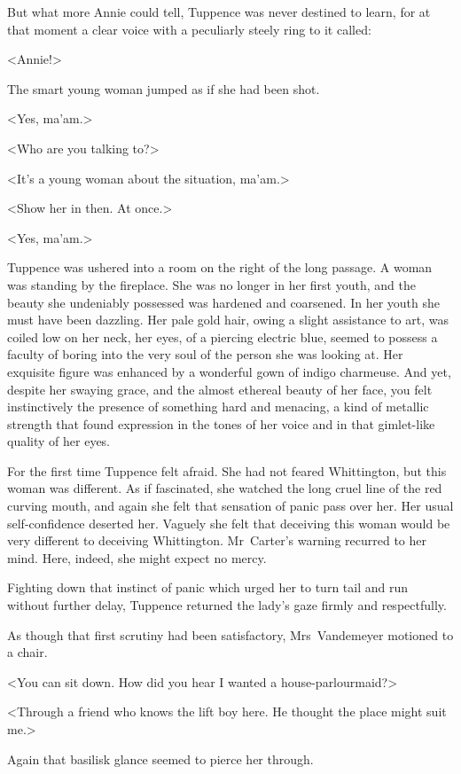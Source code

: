 But what more Annie could tell, Tuppence was never destined to learn, for at that moment a clear voice with a peculiarly steely ring to it called:

<Annie!>

The smart young woman jumped as if she had been shot.

<Yes, ma'am.>

<Who are you talking to?>

<It's a young woman about the situation, ma'am.>

<Show her in then. At once.>

<Yes, ma'am.>

Tuppence was ushered into a room on the right of the long passage. A woman was standing by the fireplace. She was no longer in her first youth, and the beauty she undeniably possessed was hardened and coarsened. In her youth she must have been dazzling. Her pale gold hair, owing a slight assistance to art, was coiled low on her neck, her eyes, of a piercing electric blue, seemed to possess a faculty of boring into the very soul of the person she was looking at. Her exquisite figure was enhanced by a wonderful gown of indigo charmeuse. And yet, despite her swaying grace, and the almost ethereal beauty of her face, you felt instinctively the presence of something hard and menacing, a kind of metallic strength that found expression in the tones of her voice and in that gimlet-like quality of her eyes.

For the first time Tuppence felt afraid. She had not feared Whittington, but this woman was different. As if fascinated, she watched the long cruel line of the red curving mouth, and again she felt that sensation of panic pass over her. Her usual self-confidence deserted her. Vaguely she felt that deceiving this woman would be very different to deceiving Whittington. Mr~Carter's warning recurred to her mind. Here, indeed, she might expect no mercy.

Fighting down that instinct of panic which urged her to turn tail and run without further delay, Tuppence returned the lady's gaze firmly and respectfully.

As though that first scrutiny had been satisfactory, Mrs~Vandemeyer motioned to a chair.

<You can sit down. How did you hear I wanted a house-parlourmaid?>

<Through a friend who knows the lift boy here. He thought the place might suit me.>

Again that basilisk glance seemed to pierce her through.

